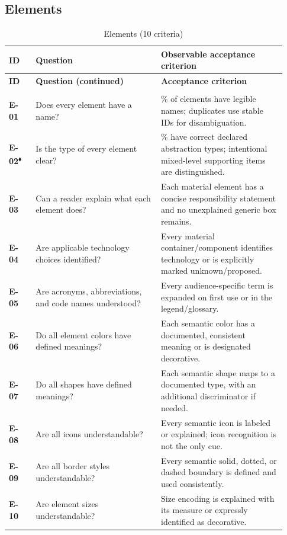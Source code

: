\documentclass[10pt,letterpaper]{article}
\newcommand{\Gate}{\textsuperscript{\(\blacklozenge\)}}
\newcommand{\CheckRow}[3]{\textbf{\textsf{#1}} & #2 & #3\\[3pt]}
\newcommand{\ChecklistHeader}{\toprule
\textbf{ID} & \textbf{Question} & \textbf{Observable acceptance criterion}\\\midrule
\endfirsthead
\toprule\textbf{ID} & \textbf{Question (continued)} & \textbf{Acceptance criterion}\\\midrule
\endhead
\midrule\multicolumn{3}{r}{\footnotesize Continued on next page}\\\endfoot
\bottomrule\endlastfoot}
\begin{document}
\subsection{Elements}
\begin{longtable}{@{}>{\raggedright\arraybackslash}p{0.09\linewidth}>{\raggedright\arraybackslash}p{0.42\linewidth}>{\raggedright\arraybackslash}p{0.42\linewidth}@{}}
\caption{Elements (10 criteria)}\label{tab:review-E}\\
\ChecklistHeader
\CheckRow{E-01}{Does every element have a name?}{100\% of elements have legible names; duplicates use stable IDs for disambiguation.}
\CheckRow{E-02\Gate}{Is the type of every element clear?}{100\% have correct declared abstraction types; intentional mixed-level supporting items are distinguished.}
\CheckRow{E-03}{Can a reader explain what each element does?}{Each material element has a concise responsibility statement and no unexplained generic box remains.}
\CheckRow{E-04}{Are applicable technology choices identified?}{Every material container/component identifies technology or is explicitly marked unknown/proposed.}
\CheckRow{E-05}{Are acronyms, abbreviations, and code names understood?}{Every audience-specific term is expanded on first use or in the legend/glossary.}
\CheckRow{E-06}{Do all element colors have defined meanings?}{Each semantic color has a documented, consistent meaning or is designated decorative.}
\CheckRow{E-07}{Do all shapes have defined meanings?}{Each semantic shape maps to a documented type, with an additional discriminator if needed.}
\CheckRow{E-08}{Are all icons understandable?}{Every semantic icon is labeled or explained; icon recognition is not the only cue.}
\CheckRow{E-09}{Are all border styles understandable?}{Every semantic solid, dotted, or dashed boundary is defined and used consistently.}
\CheckRow{E-10}{Are element sizes understandable?}{Size encoding is explained with its measure or expressly identified as decorative.}
\end{longtable}
\end{document}
